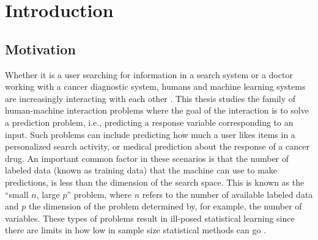 \documentclass[dissertation,math,vertlayout,pdfa,colorlinks]{aaltoseries}
\begin{document}
\chapter{Introduction}

\section{Motivation}

Whether it is a user searching for information in a search system or a doctor working with a cancer diagnostic system, humans and machine learning systems are increasingly interacting with each other \cite{amershi2014power}. This thesis studies the family of human-machine interaction problems where the goal of the interaction is to solve a prediction problem, i.e., predicting a response variable corresponding to an input. Such problems can include predicting how much a user likes items in a personalized search activity, or medical prediction about the response of a cancer drug. An important common factor in these scenarios is that the number of labeled data (known as training data) that the machine can use to make predictions, is less than the dimension of the search space. This is known as the ``small $n$, large $p$'' problem, where $n$ refers to the number of available labeled data and $p$ the dimension of the problem determined by, for example, the number of variables. These types of problems result in ill-posed statistical learning since there are limits in how low in sample size statistical methods can go \cite{Donoho2009observed}. 

 


\end{document}
